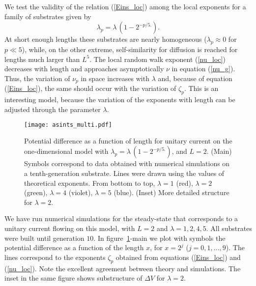 \documentclass[12pt]{iopart}
\begin{document}
We test the validity of the relation (\ref{Eins_loc})
among the local exponents for a  family of substrates
 given by 
\begin{equation}
  \lambda_p=\lambda\,  (1-2^{-p/5.}).
  \label{lambda_p_1d}
\end{equation}
At short enough lengths  these substrates are nearly homogeneous
($\lambda_p\approx 0$ for $p\ll 5$), while,  on the other extreme,
 self-similarity for diffusion is reached for lengths 
much larger than $L^5$. The local random walk 
exponent (\ref{nu_loc})  decreases with length and approaches
asymptotically $\nu$ in equation (\ref{nu_g}). Thus,   the 
variation of $\nu_p$ in space increases with $\lambda$ and, because of 
equation (\ref{Eins_loc}), the same should occur with the variation of
$\zeta_p$. This is an interesting model, because the variation of the
exponents with length can be adjusted  through the parameter
$\lambda$. 


\begin{figure}[!ht]
	\begin{center}
	 \texttt{[image: asints\_multi.pdf]}	  
 \end{center}
	\caption{Potential difference as a function of length for unitary 
    current on the one-dimensional model with $\lambda_p=\lambda\,
    (1-2^{-p/5.})$, and $L=2$. 
    (Main) Symbols correspond to data obtained with numerical simulations on a tenth-generation
    substrate. Lines were drawn using the values of theoretical exponents.
    From bottom to top, $\lambda = 1$ (red), $\lambda = 2$ (green), $\lambda
    =4$ (violet), $\lambda=5$ (blue).  
    (Inset) More detailed structure for $\lambda=2$.
	}
    \label{V_x_1D}
\end{figure}

We have run numerical simulations for the steady-state that corresponds to a
unitary current flowing on this model, with
$L=2$ and $\lambda=1, 2, 4, 5$. All substrates were built until generation $10$.
In figure~\ref{V_x_1D}-main we plot with symbols the potential difference as
a function of the length $x$, for  $x=2^j$ ($j=0, 1,...,9$).
The lines correspond to the exponents $\zeta_{p}$ obtained from equations
(\ref{Eins_loc}) and (\ref{nu_loc}). Note the excellent  agreement between
theory and simulations. The inset in the same figure shows 
substructure of $\Delta V$ for  $\lambda=2$.
\end{document}
